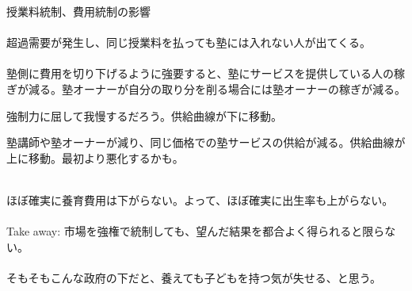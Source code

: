 \begin{frame}{}
授業料統制、費用統制の影響\\~\\
超過需要が発生し、同じ授業料を払っても塾には入れない人が出てくる。\\~\\
\pause
塾側に費用を切り下げるように強要すると、塾にサービスを提供している人の稼ぎが減る。塾オーナーが自分の取り分を削る場合には塾オーナーの稼ぎが減る。
\begin{description}
\vspace{1.0ex}\setlength{\itemsep}{1.0ex}\setlength{\baselineskip}{12pt}
\pause
\item[短期]	強制力に屈して我慢するだろう。供給曲線が下に移動。
\pause
\item[長期]	塾講師や塾オーナーが減り、同じ価格での塾サービスの供給が減る。供給曲線が上に移動。最初より悪化するかも。\\~\\
\end{description}
\pause
ほぼ確実に養育費用は下がらない。よって、ほぼ確実に出生率も上がらない。\\~\\
\pause
Take away: 市場を強権で統制しても、望んだ結果を都合よく得られると限らない。\\~\\
\pause
そもそもこんな政府の下だと、養えても子どもを持つ気が失せる、と思う。
\end{frame}

